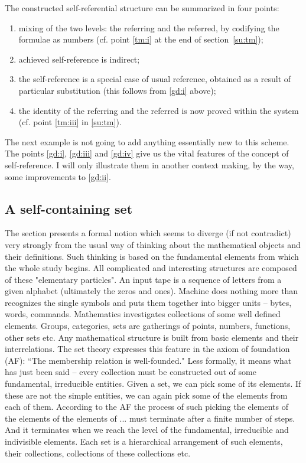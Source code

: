 The constructed self-referential structure can be summarized in four points:
\begin{enumerate}
\item \label{gd:i}mixing of the two levels: the referring and the referred, by codifying the formulae as numbers (cf. point \ref{tm:i} at the end of section~\ref{su:tm});
\item \label{gd:ii}achieved self-reference is indirect;
\item \label{gd:iii}the self-reference is a special case of usual reference, obtained as a result of particular substitution (this follows from \ref{gd:i} above);
\item \label{gd:iv}the identity of the referring and the referred is now proved within the system (cf. point \ref{tm:iii} in \ref{su:tm}).
\end{enumerate}
The next example is not going to add anything essentially new to this scheme. 
The points \ref{gd:i}, \ref{gd:iii} and \ref{gd:iv} give us 
the vital features of the concept of self-reference. I will only illustrate them in another context making, by the way, some 
improvements to \ref{gd:ii}.

\subsection{A self-containing set}\label{su:nwf}

The section presents a formal notion which seems to diverge (if not contradict) very strongly from the usual way 
of thinking about the mathematical objects and their definitions. Such thinking is based on the fundamental 
elements from which the whole study begins. All complicated and interesting structures are composed of these 
"elementary particles". An input tape is a sequence of letters from a given alphabet (ultimately the zeros and ones). 
Machine does nothing more than recognizes the single symbols and puts them together into bigger units -- bytes, 
words, commands. Mathematics investigates collections of some well defined elements. Groups, categories, sets 
are gatherings of points, numbers, functions, other sets etc. Any mathematical structure is built from basic 
elements and their interrelations.
The set theory expresses this feature in the axiom of foundation (AF): ``The membership relation is well-founded."
Less formally, it means what has just been said -- every collection must be constructed out of 
some fundamental, irreducible entities. Given a set, we can pick some of its elements. If these are not the simple 
entities, we can again pick some of the elements from each of them. According to the AF the process of such 
picking the elements of the elements of the elements of ... must terminate after a finite number of steps. And it 
terminates when we reach the level of the fundamental, irreducible and indivisible elements. Each set is a 
hierarchical arrangement of such elements, their collections, collections of these collections etc.

